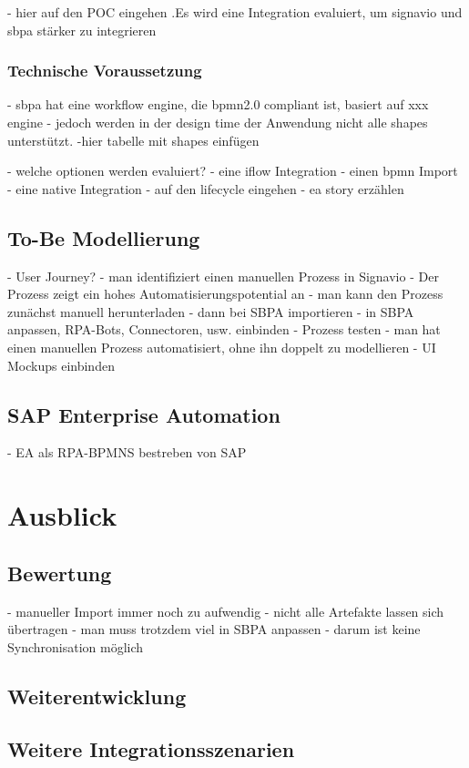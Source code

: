    - hier auf den POC eingehen
    .Es wird eine Integration evaluiert, um signavio und sbpa stärker zu integrieren
\subsection{Technische Voraussetzung}
- sbpa hat eine workflow engine, die bpmn2.0 compliant ist, basiert auf xxx engine
- jedoch werden in der design time der Anwendung nicht alle shapes unterstützt.
-hier tabelle mit shapes einfügen

   - welche optionen werden evaluiert?
    - eine iflow Integration
    - einen bpmn Import
    - eine native Integration
    - auf den lifecycle eingehen
    - ea story erzählen
    
    \section{To-Be Modellierung}
    - User Journey?
    - man identifiziert einen manuellen Prozess in Signavio
    - Der Prozess zeigt ein hohes Automatisierungspotential an
    - man kann den Prozess zunächst manuell herunterladen
    - dann bei SBPA importieren
    - in SBPA anpassen, RPA-Bots, Connectoren, usw. einbinden
    - Prozess testen
    - man hat einen manuellen Prozess automatisiert, ohne ihn doppelt zu modellieren
    - UI Mockups einbinden
    \section[short]{SAP Enterprise Automation}
    - EA als RPA-BPMNS bestreben von SAP
\chapter{Ausblick}
    \section{Bewertung}
    - manueller Import immer noch zu aufwendig
    - nicht alle Artefakte lassen sich übertragen
        - man muss trotzdem viel in SBPA anpassen
        - darum ist keine Synchronisation möglich
    \section{Weiterentwicklung}
    \section{Weitere Integrationsszenarien}